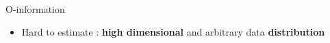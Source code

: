 \documentclass{beamer}
\begin{document}
\begin{frame}{O-information}
\begin{itemize}

    \item Hard to estimate :
    \textbf{high dimensional} and arbitrary data \textbf{distribution}
\end{itemize}

\end{frame}






%     



\end{document}
